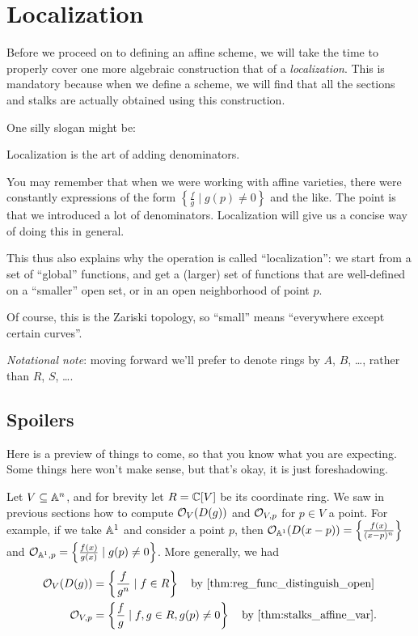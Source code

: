 \chapter{Localization}
\label{ch:localization}
Before we proceed on to defining an affine scheme,
we will take the time to properly cover one more algebraic construction
that of a \emph{localization}.
This is mandatory because when we define a scheme,
we will find that all the sections and stalks
are actually obtained using this construction.

One silly slogan might be:
\begin{moral}
	Localization is the art of adding denominators.
\end{moral}
You may remember that when we were working with affine varieties,
there were constantly expressions of the form
$\left\{ \frac{f}{g} \mid g(p) \neq 0 \right\}$
and the like.
The point is that we introduced a lot of denominators.
Localization will give us a concise way of doing this in general.

This thus also explains why the operation is called ``localization'':
we start from a set of ``global'' functions, and get a (larger) set of functions
that are well-defined on a ``smaller'' open set, or in an open neighborhood
of point $p$.

Of course, this is the Zariski topology, so ``small'' means ``everywhere except certain curves''.

\emph{Notational note}:
moving forward we'll prefer to denote rings by $A$, $B$, \dots,
rather than $R$, $S$, \dots.

\section{Spoilers}
Here is a preview of things to come,
so that you know what you are expecting.
Some things here won't make sense,
but that's okay, it is just foreshadowing.

Let $V \subseteq \mathbb A^n$, and for brevity let $R = \mathbb C[V]$ be its coordinate ring.
We saw in previous sections how to compute $\mathcal O_V(D(g))$
and $\mathcal O_{V, p}$ for $p \in V$ a point.
For example, if we take $\mathbb A^1$ and consider a point $p$, then
$\mathcal O_{\mathbb A^1}(D(x-p)) = \left\{ \frac{f(x)}{(x-p)^n} \right\}$
and $\mathcal O_{\mathbb A^1, p} = \left\{ \frac{f(x)}{g(x)} \mid g(p) \neq 0 \right\}$.
More generally, we had
\begin{align*}
	\OO_{V}(D(g)) &= \left\{ \frac{f}{g^n} \mid f \in R \right\}
		\quad\text{by \Cref{thm:reg_func_distinguish_open}} \\
	\OO_{V,p} &= \left\{ \frac{f}{g} \mid f,g \in R, g(p) \neq 0 \right\}
		\quad\text{by \Cref{thm:stalks_affine_var}}.
\end{align*}

